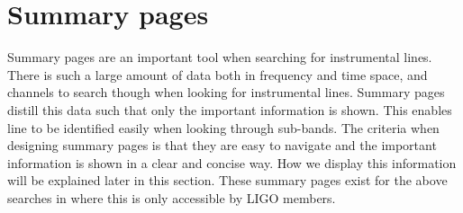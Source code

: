\clearpage 
\section{\label{detchar:summary}Summary pages}

Summary pages are an important tool when searching for instrumental lines. 
There is such a large amount of data both in frequency and time space, and channels to search though when looking for instrumental lines.
Summary pages distill this data such that only the important information is shown.
This enables line to be identified easily when looking through sub-bands. 
The criteria when designing summary pages is that they are easy to navigate and the important information is shown in a clear and concise way.
How we display this information will be explained later in this section.
These summary pages exist for the above searches in \citep{bayleyHome} where this is only accessible by \gls{LIGO} members.


